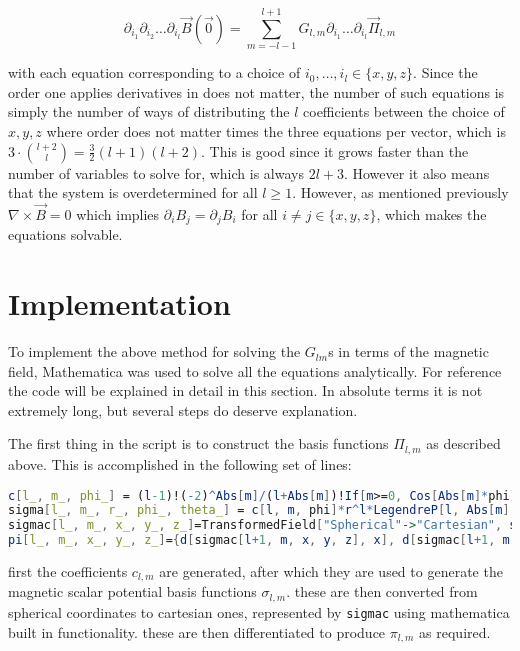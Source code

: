 \documentclass{article}
\begin{document}
\begin{equation}
    \partial_{i_1}\partial_{i_2}\ldots\partial_{i_l}\vec B(\vec0)=\sum_{m=-l-1}^{l+1}G_{l, m}\partial_{i_1}\ldots\partial_{i_l}\vec\Pi_{l, m}
\end{equation}

with each equation corresponding to a choice of $i_0, \ldots, i_l\in \{x, y, z\}$. Since the order one applies derivatives in does not matter, the number of such equations is simply the number of ways of distributing the $l$ coefficients between the choice of ${x, y, z}$ where order does not matter times the three equations per vector, which is $3\cdot{{l+2}\choose{l}}=\frac32(l+1)(l+2)$. This is good since it grows faster than the number of variables to solve for, which is always $2l+3$. However it also means that the system is overdetermined for all $l\geq1$. However, as mentioned previously $\nabla\times\vec B=0$ which implies $\partial_iB_j=\partial_jB_i$ for all $i\neq j\in\{x, y, z\}$, which makes the equations solvable. 

\section{Implementation}

To implement the above method for solving the $G_{lm}$s in terms of the magnetic field, Mathematica was used to solve all the equations analytically. For reference the code will be explained in detail in this section. In absolute terms it is not extremely long, but several steps do deserve explanation. 

The first thing in the script is to construct the basis functions $\Pi_{l, m}$ as described above. This is accomplished in the following set of lines: 

\begin{lstlisting}[language=Mathematica]
c[l_, m_, phi_] = (l-1)!(-2)^Abs[m]/(l+Abs[m])!If[m>=0, Cos[Abs[m]*phi], Sin[Abs[m]*phi]];
sigma[l_, m_, r_, phi_, theta_] = c[l, m, phi]*r^l*LegendreP[l, Abs[m], Cos[theta]];
sigmac[l_, m_, x_, y_, z_]=TransformedField["Spherical"->"Cartesian", sigma[l, m, r, phi, theta], {r, theta, phi}->{x, y, z}];
pi[l_, m_, x_, y_, z_]={d[sigmac[l+1, m, x, y, z], x], d[sigmac[l+1, m, x, y, z], y], d[sigmac[l+1, m, x, y, z], z]};
\end{lstlisting}

first the coefficients $c_{l, m}$ are generated, after which they are used to generate the magnetic scalar potential basis functions $\sigma_{l, m}$. these are then converted from spherical coordinates to cartesian ones, represented by \lstinline{sigmac} using mathematica built in functionality. these are then differentiated to produce $\pi_{l, m}$ as required. 
\end{document}
